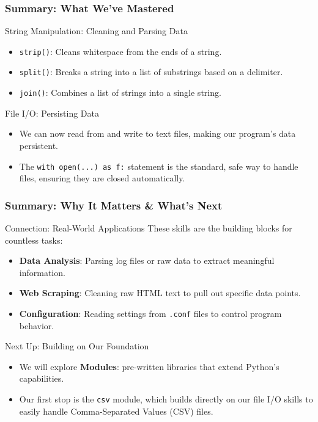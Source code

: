 \documentclass{beamer}
\begin{document}
\begin{frame}[fragile]
    \frametitle{Summary: What We've Mastered}
    \begin{block}{String Manipulation: Cleaning and Parsing Data}
        \begin{itemize}
            \item \texttt{strip()}: Cleans whitespace from the ends of a string.
            \item \texttt{split()}: Breaks a string into a list of substrings based on a delimiter.
            \item \texttt{join()}: Combines a list of strings into a single string.
        \end{itemize}
    \end{block}

    \vspace{1em}

    \begin{block}{File I/O: Persisting Data}
        \begin{itemize}
            \item We can now read from and write to text files, making our program's data persistent.
            \item The \texttt{with open(...) as f:} statement is the standard, safe way to handle files, ensuring they are closed automatically.
        \end{itemize}
    \end{block}
\end{frame}

\begin{frame}[fragile]
    \frametitle{Summary: Why It Matters \& What's Next}
    \begin{block}{Connection: Real-World Applications}
        These skills are the building blocks for countless tasks:
        \begin{itemize}
            \item \textbf{Data Analysis}: Parsing log files or raw data to extract meaningful information.
            \item \textbf{Web Scraping}: Cleaning raw HTML text to pull out specific data points.
            \item \textbf{Configuration}: Reading settings from \texttt{.conf} files to control program behavior.
        \end{itemize}
    \end{block}

    \vspace{1em}

    \begin{block}{Next Up: Building on Our Foundation}
        \begin{itemize}
            \item We will explore \textbf{Modules}: pre-written libraries that extend Python's capabilities.
            \item Our first stop is the \texttt{csv} module, which builds directly on our file I/O skills to easily handle Comma-Separated Values (CSV) files.
        \end{itemize}
    \end{block}
\end{frame}
\end{document}
